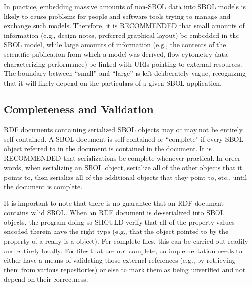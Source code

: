 In practice, 
embedding massive amounts of non-SBOL data into SBOL models is likely
to cause problems for people and software tools trying to manage and
exchange such models.  Therefore, it is RECOMMENDED that small amounts of information (e.g., design notes, preferred graphical layout) be embedded in the SBOL model, while large amounts of information (e.g., the contents of the scientific publication from which a model was derived, flow cytometry data characterizing performance) be linked with URIs pointing to external resources.  The boundary between ``small'' and ``large'' is left deliberately vague, recognizing that it will likely depend on the particulars of a given SBOL application.

\subsection{Completeness and Validation}

RDF documents containing serialized SBOL objects may or may not be
entirely self-contained.  A SBOL document is self-contained or ``complete'' if every SBOL object referred to in the document is contained in the document.  It is RECOMMENDED that serializations be complete whenever practical.  In order words, when serializing an SBOL object, serialize all of the other objects that it points to, then serialize all of the additional objects that they point to, etc., until the document is complete.

It is important to note that there is no guarantee that an RDF document
contains valid SBOL. When an RDF document is de-serialized into SBOL
objects, the program doing so SHOULD verify that all of the property
values encoded therein have the right type (e.g., that the object
pointed to by the  property of a
 really is a  object).
For complete files, this can be carried out readily and entirely
locally.  For files that are not complete, an implementation needs to
either have a means of validating those external references (e.g., by
retrieving them from various repositories) or else to mark them as
being unverified and not depend on their correctness.

